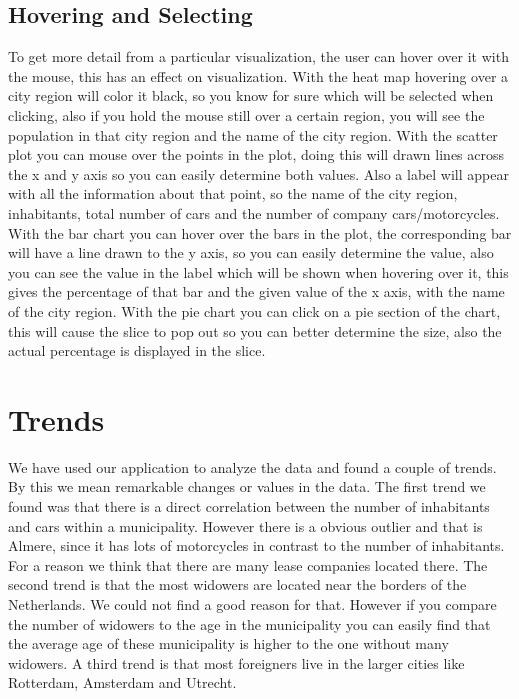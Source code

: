 \documentclass[a4paper,twoside,11pt]{article}
\begin{document}
\subsection{Hovering and Selecting}
To get more detail from a particular visualization, the user can hover over it with the mouse, this has an effect on visualization. \newline
With the heat map hovering over a city region will color it black, so you know for sure which will be selected when clicking, also if you hold the mouse still over a certain region, you will see the population in that city region and the name of the city region. \newline
With the scatter plot you can mouse over the points in the plot, doing this will drawn lines across the x and y axis so you can easily determine both values. Also a label will appear with all the information about that point, so the name of the city region, inhabitants, total number of cars and the number of company cars/motorcycles. \newline
With the bar chart you can hover over the bars in the plot, the corresponding bar will have a line drawn to the y axis, so you can easily determine the value, also you can see the value in the label which will be shown when hovering over it, this gives the percentage of that bar and the given value of the x axis, with the name of the city region. \newline
With the pie chart you can click on a pie section of the chart, this will cause the slice to pop out so you can better determine the size, also the actual percentage is displayed in the slice. \newline
\newpage

\section{Trends}
We have used our application to analyze the data and found a couple of trends. By
this we mean remarkable changes or values in the data. \newline \newline
The first trend we found was that there is a direct correlation between the number of inhabitants and cars within a municipality. However there is a obvious outlier and that is Almere, since it has lots of motorcycles in contrast to the number of inhabitants. For a reason we think that there are many lease companies located there. \newline \newline
The second trend is that the most widowers are located near the borders of the Netherlands. We could not find a good reason for that. However if you compare the number of widowers to the age in the municipality you can easily find that the average age of these municipality is higher to the one without many widowers. \newline \newline
A third trend is that most foreigners live in the larger cities like Rotterdam, Amsterdam and Utrecht.
\newpage
\end{document}

